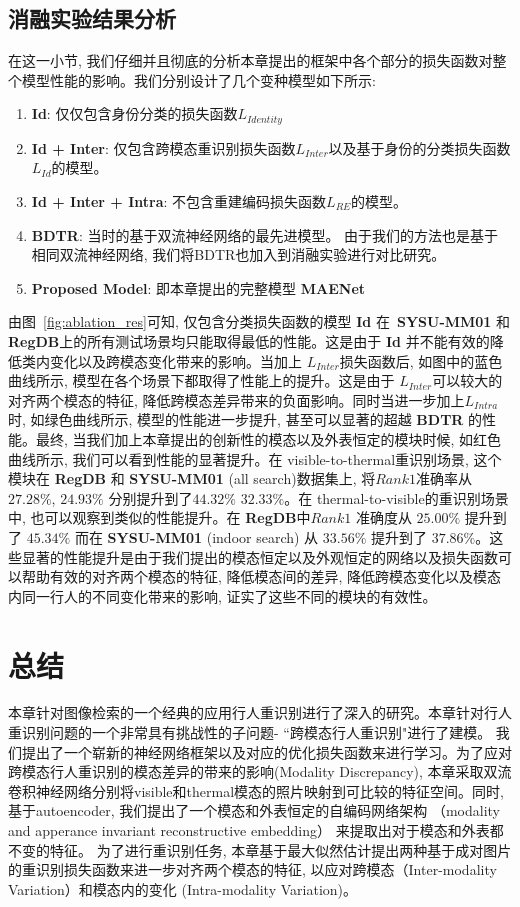 \subsection{消融实验结果分析}
在这一小节, 我们仔细并且彻底的分析本章提出的框架中各个部分的损失函数对整个模型性能的影响。我们分别设计了几个变种模型如下所示:




\begin{enumerate}
  \item \textbf{Id}: 仅仅包含身份分类的损失函数$L_{Identity}$
  \item \textbf{Id + Inter}: 仅包含跨模态重识别损失函数$L_{Inter}$以及基于身份的分类损失函数$L_{Id} $的模型。
  \item \textbf{Id + Inter + Intra}: 不包含重建编码损失函数$L_{RE}$的模型。
  \item \textbf{BDTR}: 当时的基于双流神经网络的最先进模型。 由于我们的方法也是基于相同双流神经网络, 我们将BDTR也加入到消融实验进行对比研究。
  \item \textbf{Proposed Model}: 即本章提出的完整模型 \textbf{MAENet}
\end{enumerate}

由图~\ref{fig:ablation_res}可知, 仅包含分类损失函数的模型 \textbf{Id} 在~\textbf{SYSU-MM01} 和 \textbf{RegDB}上的所有测试场景均只能取得最低的性能。这是由于 \textbf{Id} 并不能有效的降低类内变化以及跨模态变化带来的影响。当加上 $L_{Inter}$损失函数后, 如图中的蓝色曲线所示, 模型在各个场景下都取得了性能上的提升。这是由于 $L_{Inter}$可以较大的对齐两个模态的特征, 降低跨模态差异带来的负面影响。同时当进一步加上$L_{Intra}$时, 如绿色曲线所示, 模型的性能进一步提升, 甚至可以显著的超越 \textbf{BDTR} 的性能。最终, 当我们加上本章提出的创新性的模态以及外表恒定的模块时候, 如红色曲线所示, 我们可以看到性能的显著提升。在 visible-to-thermal重识别场景, 这个模块在 \textbf{RegDB} 和 \textbf{SYSU-MM01} (all search)数据集上, 将$Rank1$准确率从$27.28 \%$, $24.93 \%$ 分别提升到了$44.32\%$ $32.33 \%$。在 thermal-to-visible的重识别场景中, 也可以观察到类似的性能提升。在 \textbf{RegDB}中$Rank1$ 准确度从 $25.00 \%$ 提升到了 $45.34 \%$ 而在 \textbf{SYSU-MM01} (indoor search) 从 $33.56 \%$ 提升到了 $37.86 \%$。这些显著的性能提升是由于我们提出的模态恒定以及外观恒定的网络以及损失函数可以帮助有效的对齐两个模态的特征, 降低模态间的差异, 降低跨模态变化以及模态内同一行人的不同变化带来的影响, 证实了这些不同的模块的有效性。

\section{总结}
本章针对图像检索的一个经典的应用行人重识别进行了深入的研究。本章针对行人重识别问题的一个非常具有挑战性的子问题- ``跨模态行人重识别"进行了建模。 我们提出了一个崭新的神经网络框架以及对应的优化损失函数来进行学习。为了应对跨模态行人重识别的模态差异的带来的影响(Modality Discrepancy), 本章采取双流卷积神经网络分别将visible和thermal模态的照片映射到可比较的特征空间。同时, 基于autoencoder, 我们提出了一个模态和外表恒定的自编码网络架构 （modality and apperance invariant reconstructive embedding） 来提取出对于模态和外表都不变的特征。 为了进行重识别任务, 本章基于最大似然估计提出两种基于成对图片的重识别损失函数来进一步对齐两个模态的特征, 以应对跨模态（Inter-modality Variation）和模态内的变化 (Intra-modality Variation)。